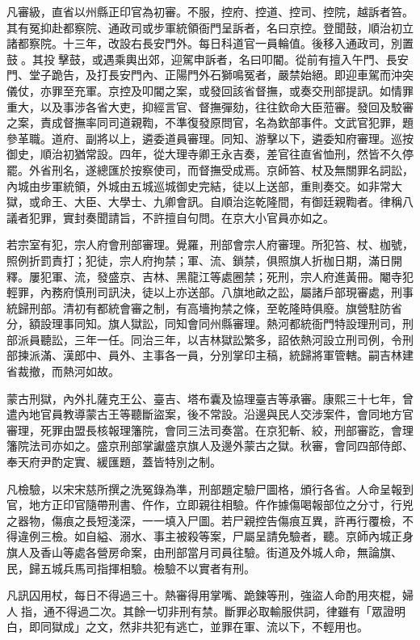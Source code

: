 \begin{pinyinscope}
凡審級，直省以州縣正印官為初審。不服，控府、控道、控司、控院，越訴者笞。其有冤抑赴都察院、通政司或步軍統領衙門呈訴者，名曰京控。登聞鼓，順治初立諸都察院。十三年，改設右長安門外。每日科道官一員輪值。後移入通政司，別置鼓。其投擊鼓，或遇乘輿出郊，迎駕申訴者，名曰叩閽。從前有擅入午門、長安門、堂子跪告，及打長安門內、正陽門外石獅鳴冤者，嚴禁始絕。即迎車駕而沖突儀仗，亦罪至充軍。京控及叩閽之案，或發回該省督撫，或奏交刑部提訊。如情罪重大，以及事涉各省大吏，抑經言官、督撫彈劾，往往欽命大臣蒞審。發回及駮審之案，責成督撫率同司道親鞫，不準復發原問官，名為欽部事件。文武官犯罪，題參革職。道府、副將以上，遴委道員審理。同知、游擊以下，遴委知府審理。巡按御史，順治初猶常設。四年，從大理寺卿王永吉奏，差官往直省恤刑，然皆不久停罷。外省刑名，遂總匯於按察使司，而督撫受成焉。京師笞、杖及無關罪名詞訟，內城由步軍統領，外城由五城巡城御史完結，徒以上送部，重則奏交。如非常大獄，或命王、大臣、大學士、九卿會訊。自順治迄乾隆間，有御廷親鞫者。律稱八議者犯罪，實封奏聞請旨，不許擅自句問。在京大小官員亦如之。

若宗室有犯，宗人府會刑部審理。覺羅，刑部會宗人府審理。所犯笞、杖、枷號，照例折罰責打；犯徒，宗人府拘禁；軍、流、鎖禁，俱照旗人折枷日期，滿日開釋。屢犯軍、流，發盛京、吉林、黑龍江等處圈禁；死刑，宗人府進黃冊。閹寺犯輕罪，內務府慎刑司訊決，徒以上亦送部。八旗地畝之訟，屬諸戶部現審處，刑事統歸刑部。清初有都統會審之制，有高墻拘禁之條，至乾隆時俱廢。旗營駐防省分，額設理事同知。旗人獄訟，同知會同州縣審理。熱河都統衙門特設理刑司，刑部派員聽訟，三年一任。同治三年，以吉林獄訟繁多，詔依熱河設立刑司例，令刑部揀派滿、漢郎中、員外、主事各一員，分別掌印主稿，統歸將軍管轄。嗣吉林建省裁撤，而熱河如故。

蒙古刑獄，內外扎薩克王公、臺吉、塔布囊及協理臺吉等承審。康熙三十七年，曾遣內地官員教導蒙古王等聽斷盜案，後不常設。沿邊與民人交涉案件，會同地方官審理，死罪由盟長核報理籓院，會同三法司奏當。在京犯斬、絞，刑部審訖，會理籓院法司亦如之。盛京刑部掌讞盛京旗人及邊外蒙古之獄。秋審，會同四部侍郎、奉天府尹酌定實、緩匯題，蓋皆特別之制。

凡檢驗，以宋宋慈所撰之洗冤錄為準，刑部題定驗尸圖格，頒行各省。人命呈報到官，地方正印官隨帶刑書、仵作，立即親往相驗。仵作據傷喝報部位之分寸，行兇之器物，傷痕之長短淺深，一一填入尸圖。若尸親控告傷痕互異，許再行覆檢，不得違例三檢。如自縊、溺水、事主被殺等案，尸屬呈請免驗者，聽。京師內城正身旗人及香山等處各營房命案，由刑部當月司員往驗。街道及外城人命，無論旗、民，歸五城兵馬司指揮相驗。檢驗不以實者有刑。

凡訊囚用杖，每日不得過三十。熱審得用掌嘴、跪鍊等刑，強盜人命酌用夾棍，婦人指，通不得過二次。其餘一切非刑有禁。斷罪必取輸服供詞，律雖有「眾證明白，即同獄成」之文，然非共犯有逃亡，並罪在軍、流以下，不輕用也。


\end{pinyinscope}
